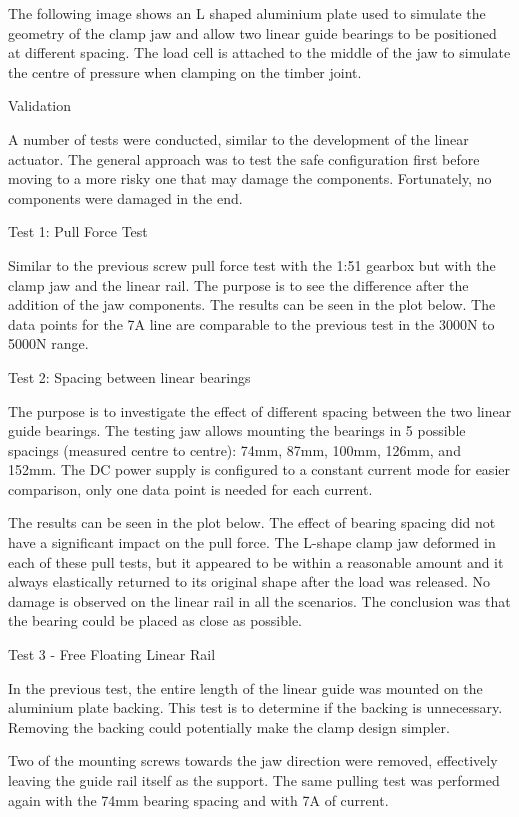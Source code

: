 The following image shows an L shaped aluminium plate used to simulate the geometry of the clamp jaw and allow two linear guide bearings to be positioned at different spacing. The load cell is attached to the middle of the jaw to simulate the centre of pressure when clamping on the timber joint.


Validation

A number of tests were conducted, similar to the development of the linear actuator. The general approach was to test the safe configuration first before moving to a more risky one that may damage the components. Fortunately, no components were damaged in the end.

Test 1: Pull Force Test

Similar to the previous screw pull force test with the 1:51 gearbox but with the clamp jaw and the linear rail. The purpose is to see the difference after the addition of the jaw components. The results can be seen in the plot below. The data points for the 7A line are comparable to the previous test in the 3000N to 5000N range. 


Test 2: Spacing between linear bearings

The purpose is to investigate the effect of different spacing between the two linear guide bearings. The testing jaw allows mounting the bearings in 5 possible spacings (measured centre to centre): 74mm, 87mm, 100mm, 126mm, and 152mm. The DC power supply is configured to a constant current mode for easier comparison, only one data point is needed for each current. 

The results can be seen in the plot below. The effect of bearing spacing did not have a significant impact on the pull force. The L-shape clamp jaw deformed in each of these pull tests, but it appeared to be within a reasonable amount and it always elastically returned to its original shape after the load was released. No damage is observed on the linear rail in all the scenarios. The conclusion was that the bearing could be placed as close as possible.

Test 3 - Free Floating Linear Rail

In the previous test, the entire length of the linear guide was mounted on the aluminium plate backing. This test is to determine if the backing is unnecessary. Removing the backing could potentially make the clamp design simpler.

Two of the mounting screws towards the jaw direction were removed, effectively leaving the guide rail itself as the support. The same pulling test was performed again with the 74mm bearing spacing and with 7A of current.

